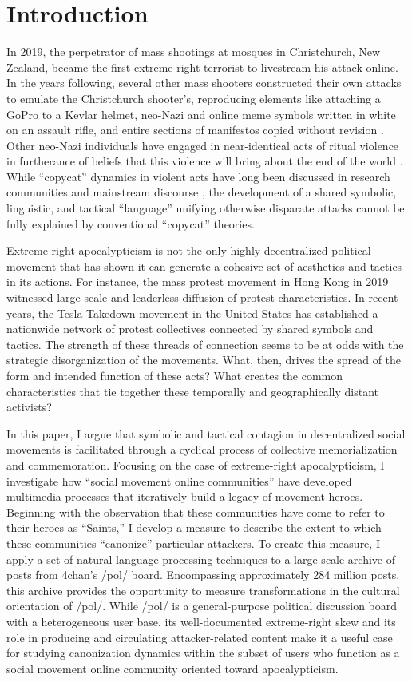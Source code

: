 \documentclass[12pt]{article}
\begin{document}
\section{Introduction}
In 2019, the perpetrator of mass shootings at mosques in Christchurch, New Zealand, became the first extreme-right terrorist to livestream his attack online. In the years following, several other mass shooters constructed their own attacks to emulate the Christchurch shooter's, reproducing elements like attaching a GoPro to a Kevlar helmet, neo-Nazi and online meme symbols written in white on an assault rifle, and entire sections of manifestos copied without revision \parencite{phillips2024he}. Other neo-Nazi individuals have engaged in near-identical acts of ritual violence in furtherance of beliefs that this violence will bring about the end of the world \parencite{shah2023occult}. While ``copycat'' dynamics in violent acts have long been discussed in research communities and mainstream discourse \parencite{towers2015contagion}, the development of a shared symbolic, linguistic, and tactical ``language'' unifying otherwise disparate attacks cannot be fully explained by conventional ``copycat'' theories.

Extreme-right apocalypticism is not the only highly decentralized political movement that has shown it can generate a cohesive set of aesthetics and tactics in its actions. For instance, the mass protest movement in Hong Kong in 2019 witnessed large-scale and leaderless diffusion of protest characteristics. In recent years, the Tesla Takedown movement in the United States has established a nationwide network of protest collectives connected by shared symbols and tactics. The strength of these threads of connection seems to be at odds with the strategic disorganization of the movements. What, then, drives the spread of the form and intended function of these acts? What creates the common characteristics that tie together these temporally and geographically distant activists?

In this paper, I argue that symbolic and tactical contagion in decentralized social movements is facilitated through a cyclical process of collective memorialization and commemoration. Focusing on the case of extreme-right apocalypticism, I investigate how ``social movement online communities'' \parencite{caren2012social} have developed multimedia processes that iteratively build a legacy of movement heroes. Beginning with the observation that these communities have come to refer to their heroes as ``Saints,'' I develop a measure to describe the extent to which these communities ``canonize'' particular attackers. To create this measure, I apply a set of natural language processing techniques to a large-scale archive of posts from 4chan's /pol/ board. Encompassing approximately 284 million posts, this archive provides the opportunity to measure transformations in the cultural orientation of /pol/. While /pol/ is a general-purpose political discussion board with a heterogeneous user base, its well-documented extreme-right skew and its role in producing and circulating attacker-related content make it a useful case for studying canonization dynamics within the subset of users who function as a social movement online community oriented toward apocalypticism.
\end{document}
